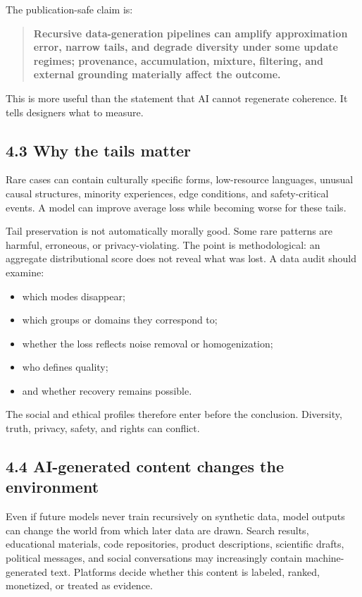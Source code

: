 \documentclass[
  11pt,
]{article}
\providecommand{\tightlist}{%
  \setlength{\itemsep}{0pt}\setlength{\parskip}{0pt}}
\begin{document}
The publication-safe claim is:

\begin{quote}
\textbf{Recursive data-generation pipelines can amplify approximation
error, narrow tails, and degrade diversity under some update regimes;
provenance, accumulation, mixture, filtering, and external grounding
materially affect the outcome.}
\end{quote}

This is more useful than the statement that AI cannot regenerate
coherence. It tells designers what to measure.

\subsection{4.3 Why the tails matter}\label{why-the-tails-matter}

Rare cases can contain culturally specific forms, low-resource
languages, unusual causal structures, minority experiences, edge
conditions, and safety-critical events. A model can improve average loss
while becoming worse for these tails.

Tail preservation is not automatically morally good. Some rare patterns
are harmful, erroneous, or privacy-violating. The point is
methodological: an aggregate distributional score does not reveal what
was lost. A data audit should examine:

\begin{itemize}
\tightlist
\item
  which modes disappear;
\item
  which groups or domains they correspond to;
\item
  whether the loss reflects noise removal or homogenization;
\item
  who defines quality;
\item
  and whether recovery remains possible.
\end{itemize}

The social and ethical profiles therefore enter before the conclusion.
Diversity, truth, privacy, safety, and rights can conflict.

\subsection{4.4 AI-generated content changes the
environment}\label{ai-generated-content-changes-the-environment}

Even if future models never train recursively on synthetic data, model
outputs can change the world from which later data are drawn. Search
results, educational materials, code repositories, product descriptions,
scientific drafts, political messages, and social conversations may
increasingly contain machine-generated text. Platforms decide whether
this content is labeled, ranked, monetized, or treated as evidence.
\end{document}
